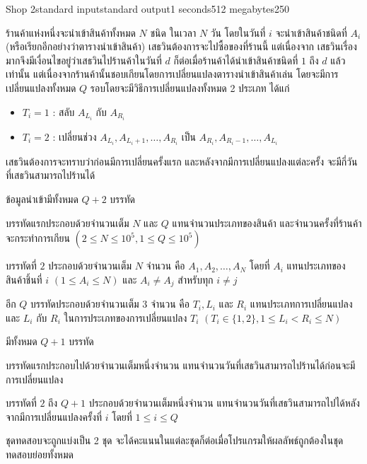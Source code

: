 \documentclass[11pt,a4paper]{article}
\begin{document}
\begin{problem}{Shop 2}{standard input}{standard output}{1 seconds}{512 megabytes}{250}


ร้านค้าแห่งหนึ่งจะนำเข้าสินค้าทั้งหมด $N$ ชนิด ในเวลา $N$ วัน โดยในวันที่ $i$ จะนำเข้าสินค้าชนิดที่ $A_i$ (หรือเรียกอีกอย่างว่าตารางนำเข้าสินค้า) เสธวินต้องการจะไปซื้อของที่ร้านนี้ แต่เนื่องจาก เสธวินเรื่องมากจึงมีเงื่อนไขอยู่ว่าเสธวินไปร้านค้าในวันที่ $d$ ก็ต่อเมื่อร้านค้าได้นำเข้าสินค้าชนิดที่ $1$ ถึง $d$ แล้วเท่านั้น แต่เนื่องจากร้านค้านั้นชอบเกียนโดยการเปลี่ยนแปลงตารางนำเข้าสินค้าเล่น โดยจะมีการเปลี่ยนแปลงทั้งหมด $Q$ รอบโดยจะมีวิธีการเปลี่ยนแปลงทั้งหมด 2 ประเภท ได้แก่

\begin{itemize}
    \item $T_i=1$ : สลับ $A_{L_i}$ กับ $A_{R_i}$
    \item $T_i=2$ : เปลี่ยนช่วง $A_{L_i},A_{L_i+1},\ldots,A_{R_i}$ เป็น $A_{R_i},A_{R_i-1},\ldots,A_{L_i}$
\end{itemize}

เสธวินต้องการจะทราบว่าก่อนมีการเปลี่ยนครั้งแรก และหลังจากมีการเปลี่ยนแปลงแต่ละครั้ง จะมีกี่วันที่เสธวินสามารถไปร้านได้

\InputFile
ข้อมูลนำเข้ามีทั้งหมด $Q+2$ บรรทัด

บรรทัดแรกประกอบด้วยจำนวนเต็ม $N$ และ $Q$ แทนจำนวนประเภทของสินค้า และจำนวนครั้งที่ร้านค้าจะกระทำการเกียน $(2\leq N\leq 10^{5},1\leq Q\leq 10^5)$

บรรทัดที่ $2$ ประกอบด้วยจำนวนเต็ม $N$ จำนวน คือ $A_1,A_2,\ldots,A_N$ โดยที่ $A_i$ แทนประเภทของสินค้าชิ้นที่ $i$ $(1\leq A_i\leq N)$ และ $A_i \neq A_j$ สำหรับทุก $i \neq j$

อีก $Q$ บรรทัดประกอบด้วยจำนวนเต็ม $3$ จำนวน คือ $T_i,L_i$ และ $R_i$ แทนประเภทการเปลี่ยนแปลง และ $L_i$ กับ $R_i$ ในการประเภทของการเปลี่ยนแปลง $T_i$ $(T_i\in\{1,2\},1\leq L_i<R_i\leq N)$

\OutputFile
มีทั้งหมด $Q+1$ บรรทัด

บรรทัดแรกประกอบไปด้วยจำนวนเต็มหนึ่งจำนวน แทนจำนวนวันที่เสธวินสามารถไปร้านได้ก่อนจะมีการเปลี่ยนแปลง

บรรทัดที่ $2$ ถึง $Q+1$ ประกอบด้วยจำนวนเต็มหนึ่งจำนวน แทนจำนวนวันที่เสธวินสามารถไปได้หลังจากมีการเปลี่ยนแปลงครั้งที่ $i$ โดยที่ $1\leq i\leq Q$

\Scoring
ชุดทดสอบจะถูกแบ่งเป็น 2 ชุด จะได้คะแนนในแต่ละชุดก็ต่อเมื่อโปรแกรมให้ผลลัพธ์ถูกต้องในชุดทดสอบย่อยทั้งหมด

\begin{description}


\end{description}
\end{problem}
\end{document}
